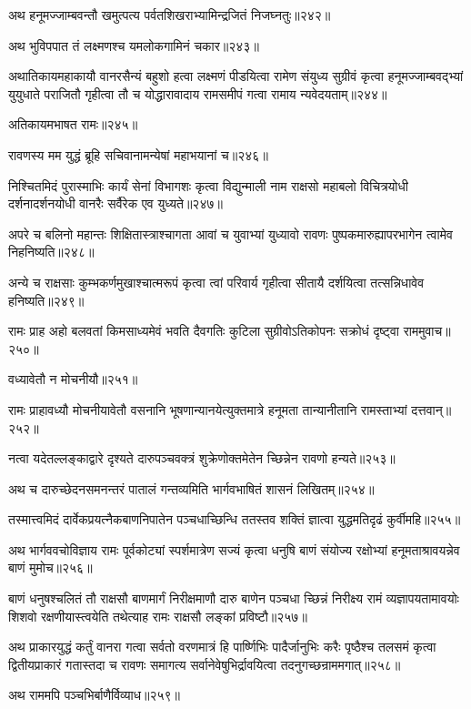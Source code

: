 \begin{flushleft}
अथ हनूमज्जाम्बवन्तौ खमुत्पत्य पर्वतशिखराभ्यामिन्द्रजितं निजघ्नतुः॥२४२॥

अथ भुविपपात तं लक्ष्मणश्च यमलोकगामिनं चकार॥२४३॥

अथातिकायमहाकायौ वानरसैन्यं बहुशो हत्वा लक्ष्मणं पीडयित्वा रामेण संयुध्य सुग्रीवं कृत्वा हनूमज्जाम्बवद्भ्यां युयुधाते पराजितौ गृहीत्वा तौ च योद्धारावादाय रामसमीपं गत्वा रामाय न्यवेदयताम्॥२४४॥

अतिकायमभाषत रामः॥२४५॥

रावणस्य मम युद्धं ब्रूहि सचिवानामन्येषां महाभयानां च॥२४६॥


निश्चितमिदं पुरास्माभिः कार्यं सेनां विभागशः कृत्वा विद्युन्माली नाम राक्षसो महाबलो विचित्रयोधी दर्शनादर्शनयोधी वानरैः सर्वैरेक एव युध्यते॥२४७॥

अपरे च बलिनो महान्तः शिक्षितास्त्राश्चागता आवां च युवाभ्यां युध्यावो रावणः पुष्पकमारुह्यापरभागेन त्वामेव निहनिष्यति॥२४८॥

अन्ये च राक्षसाः कुम्भकर्णमुखाश्चात्मरूपं कृत्वा त्वां परिवार्य गृहीत्वा सीतायै दर्शयित्वा तत्सन्निधावेव हनिष्यति॥२४९॥

रामः प्राह अहो बलवतां किमसाध्यमेवं भवति दैवगतिः कुटिला सुग्रीवोऽतिकोपनः सक्रोधं दृष्ट्वा राममुवाच॥२५०॥

वध्यावेतौ न मोचनीयौ॥२५१॥

रामः प्राहावध्यौ मोचनीयावेतौ वसनानि भूषणान्यानयेत्युक्तमात्रे हनूमता तान्यानीतानि रामस्ताभ्यां दत्तवान्॥२५२॥

नत्वा यदेतल्लङ्काद्वारे दृश्यते दारुपञ्चवक्त्रं शुक्रेणोक्तमेतेन च्छिन्नेन रावणो हन्यते॥२५३॥

अथ च दारुच्छेदनसमनन्तरं पातालं गन्तव्यमिति भार्गवभाषितं शासनं लिखितम्॥२५४॥

तस्मात्त्वमिदं दार्वेकप्रयत्नैकबाणनिपातेन पञ्चधाच्छिन्धि ततस्तव शक्तिं ज्ञात्वा युद्धमतिदृढं कुर्वीमहि॥२५५॥

अथ भार्गववचोविज्ञाय रामः पूर्वकोट्यां स्पर्शमात्रेण सज्यं कृत्वा धनुषि बाणं संयोज्य रक्षोभ्यां हनूमताश्रावयन्नेव बाणं मुमोच॥२५६॥

बाणं धनुषश्चलितं तौ राक्षसौ बाणमार्गं निरीक्षमाणौ दारु बाणेन पञ्चधा च्छिन्नं निरीक्ष्य रामं व्यज्ञापयतामावयोः शिशवो रक्षणीयास्त्वयेति तथेत्याह रामः राक्षसौ लङ्कां प्रविष्टौ॥२५७॥

अथ प्राकारयुद्धं कर्तुं वानरा गत्वा सर्वतो वरणमात्रं हि पार्ष्णिभिः पादैर्जानुभिः करैः पृष्ठैश्च तलसमं कृत्वा द्वितीयप्राकारं गतास्तदा च रावणः समागत्य सर्वानेवेषुभिर्द्रावयित्वा तदनुगच्छन्राममगात्॥२५८॥

अथ राममपि पञ्चभिर्बाणैर्विव्याध॥२५९॥


\end{flushleft}
